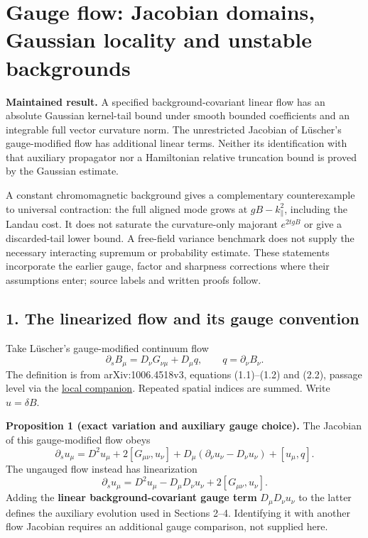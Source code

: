 \documentclass[11pt,a4paper]{article}
\begin{document}
\hypertarget{gauge-flow-jacobian-domains-gaussian-locality-and-unstable-backgrounds}{%
\section{Gauge flow: Jacobian domains, Gaussian locality and unstable
backgrounds}\label{gauge-flow-jacobian-domains-gaussian-locality-and-unstable-backgrounds}}

\textbf{Maintained result.} A specified background-covariant linear flow
has an absolute Gaussian kernel-tail bound under smooth bounded
coefficients and an integrable full vector curvature norm. The
unrestricted Jacobian of Lüscher's gauge-modified flow has additional
linear terms. Neither its identification with that auxiliary propagator
nor a Hamiltonian relative truncation bound is proved by the Gaussian
estimate.

A constant chromomagnetic background gives a complementary
counterexample to universal contraction: the full aligned mode grows at
\(gB-k_\parallel^2\), including the Landau cost. It does not saturate
the curvature-only majorant \(e^{2tgB}\) or give a discarded-tail lower
bound. A free-field variance benchmark does not supply the necessary
interacting supremum or probability estimate. These statements
incorporate the earlier gauge, factor and sharpness corrections where
their assumptions enter; source labels and written proofs follow.

\hypertarget{the-linearized-flow-and-its-gauge-convention}{%
\subsection{1. The linearized flow and its gauge
convention}\label{the-linearized-flow-and-its-gauge-convention}}

Take Lüscher's gauge-modified continuum flow
\[\partial_sB_\mu=D_\nu G_{\nu\mu}+D_\mu q,
\qquad q=\partial_\nu B_\nu.\] The definition is from arXiv:1006.4518v3,
equations (1.1)--(1.2) and (2.2), passage level via the
\href{../docs/Luscher_WilsonFlow_1006.4518v3.md}{local companion}.
Repeated spatial indices are summed. Write \(u=\delta B\).

\textbf{Proposition 1 (exact variation and auxiliary gauge choice).} The
Jacobian of this gauge-modified flow obeys
\[\partial_su_\mu=D^2u_\mu+2[G_{\mu\nu},u_\nu]
+D_\mu(\partial_\nu u_\nu-D_\nu u_\nu)+[u_\mu,q].\] The ungauged flow
instead has linearization \[\partial_su_\mu=D^2u_\mu-D_\mu D_\nu u_\nu
+2[G_{\mu\nu},u_\nu].\] Adding the \textbf{linear background-covariant
gauge term} \(D_\mu D_\nu u_\nu\) to the latter defines the auxiliary
evolution used in Sections 2--4. Identifying it with another flow
Jacobian requires an additional gauge comparison, not supplied here.
\end{document}
